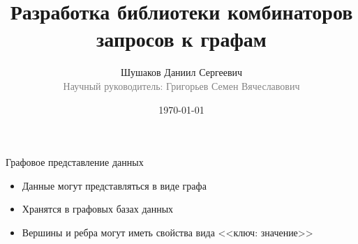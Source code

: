 \documentclass[aspectratio=169]{beamer}
\begin{document}
\title[Комбинаторы запросов к графам]
{
  Разработка библиотеки комбинаторов запросов к графам
}
\author[Шушаков Д.С.]
{
Шушаков Даниил Сергеевич\\
{\footnotesize\textcolor{gray}{Научный руководитель: Григорьев Семен Вячеславович}}\\
}
\date{\today}

\frame{\titlepage\thispagestyle{empty}}

\setlength{\parskip}{0.25cm}

\begin{frame}{Графовое представление данных}
  \begin{itemize}
    \item Данные могут представляться в виде графа
    \item Хранятся в графовых базах данных
    \item Вершины и ребра могут иметь свойства вида <<ключ: значение>>
  \end{itemize}

\end{frame}
\end{document}
